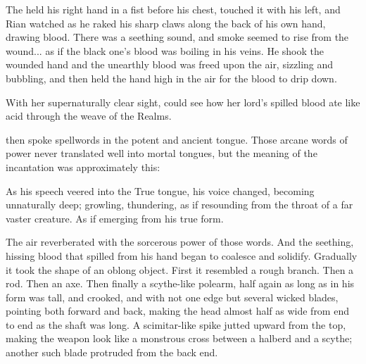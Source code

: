 \begin{prose}
  The \scatha{} held his right hand in a fist before his chest, touched it with his left, and Rian watched as he raked his sharp claws along the back of his own hand, drawing blood. There was a seething sound, and smoke seemed to rise from the wound... as if the black one's blood was boiling in his veins. He shook the wounded hand and the unearthly blood was freed upon the air, sizzling and bubbling, and then held the hand high in the air for the blood to drip down. 
  
  
  
  \new
  \index{\xzaishann}%
  With her supernaturally clear sight, \Criseis{} could see how her lord's spilled blood ate like acid through the weave of the Realms. 
  
  \QuessanthIshnaruchaefir{} then spoke spellwords in the potent and ancient  tongue. Those arcane words of power never translated well into mortal tongues, but the meaning of the incantation was approximately this: 
  
  \index{\Rystessakhin}
  \index{\AeocrithRystessakhin}
  \index{\ophidian}
  
  As his speech veered into the True \Draconic{} tongue, his voice changed, becoming unnaturally deep; growling, thundering, as if resounding from the throat of a far vaster creature. 
  As if emerging from his true form. 
  
  The air reverberated with the sorcerous power of those words. 
  And the seething, hissing blood that spilled from his hand began to coalesce and solidify. 
  Gradually it took the shape of an oblong object. 
  First it resembled a rough branch. 
  Then a rod. 
  Then an axe. 
  Then finally a scythe-like polearm, half again as long as \Ishnaruchaefir{} in his \scathaese{} form was tall, and crooked, and with not one edge but several wicked blades, pointing both forward and back, making the head almost half as wide from end to end as the shaft was long. 
  A scimitar-like spike jutted upward from the top, making the weapon look like a monstrous cross between a halberd and a scythe; another such blade protruded from the back end. 
  

\end{prose}
